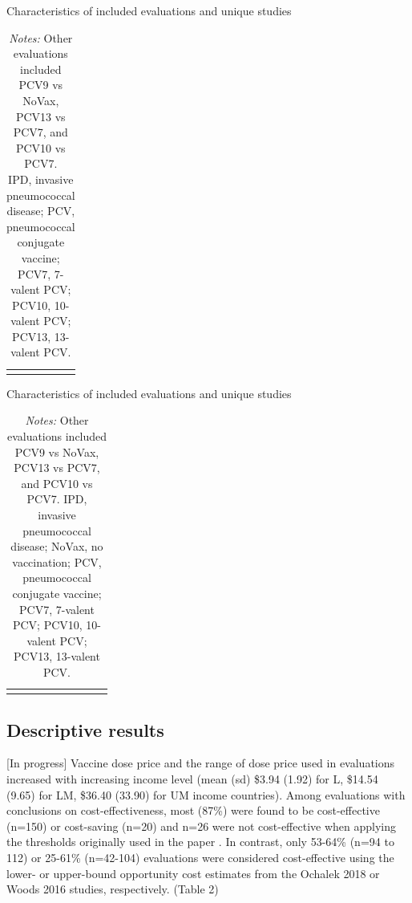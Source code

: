 \documentclass[12pt]{article}
\begin{document}
\begin{table}[H]
    \centering \singlespacing \small
    \caption{Characteristics of included evaluations and unique studies}
    \begin{tabular}{|L{6cm}|C{4.5cm}|C{4cm}|}
        \hline
    \end{tabular}
    \label{tab_evals_studies}
    \caption*{\footnotesize \textit{Notes:} Other evaluations included PCV9 vs NoVax, PCV13 vs PCV7, and PCV10 vs PCV7. \\
    IPD, invasive pneumococcal disease; PCV, pneumococcal conjugate vaccine; PCV7, 7-valent PCV; PCV10, 10-valent PCV; PCV13, 13-valent PCV. 
}
\end{table}


\begin{table}[H]
    \centering \singlespacing \small
    \caption{Characteristics of included evaluations and unique studies}
    \begin{tabular}{|L{2.8cm}|C{1.8cm}|C{1.3cm}|C{1cm}|C{1cm}|C{1cm}|C{1cm}|C{1cm}|C{1cm}|}
        \hline
    \end{tabular}
    \label{tab_evals_thresholds}
    \caption*{\footnotesize \textit{Notes:} Other evaluations included PCV9 vs NoVax, PCV13 vs PCV7, and PCV10 vs PCV7. IPD, invasive pneumococcal disease; NoVax, no vaccination; PCV, pneumococcal conjugate vaccine; PCV7, 7-valent PCV; PCV10, 10-valent PCV; PCV13, 13-valent PCV. 
}
\end{table}


\subsection{Descriptive results}
[In progress]
Vaccine dose price and the range of dose price used in evaluations increased with increasing income level (mean (sd) \$3.94 (1.92) for L, \$14.54 (9.65) for LM, \$36.40 (33.90)  for UM income countries). 
Among evaluations with conclusions on cost-effectiveness, most (87\%) were found to be cost-effective (n=150) or cost-saving (n=20) and n=26 were not cost-effective when applying the thresholds originally used in the paper . In contrast, only 53-64\% (n=94 to 112) or 25-61\% (n=42-104) evaluations were considered cost-effective using the lower- or upper-bound opportunity cost estimates from the Ochalek 2018 or Woods 2016 studies, respectively. (Table 2)
\end{document}
